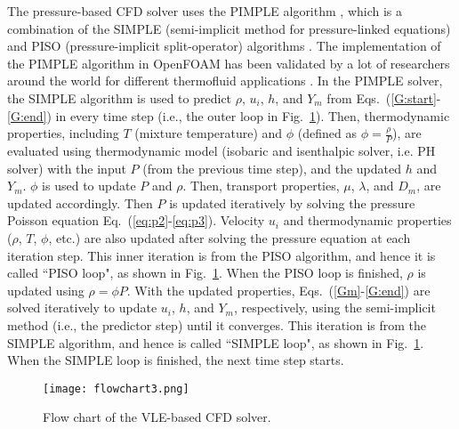 The pressure-based CFD solver uses the PIMPLE algorithm \cite{holzmann2016mathematics}, which is a combination of the SIMPLE (semi-implicit method for pressure-linked equations) \cite{patankar1983calculation} and PISO (pressure-implicit split-operator) algorithms \cite{issa1986solution}. The implementation of the PIMPLE algorithm in OpenFOAM has been validated by a lot of researchers around the world for different thermofluid applications \cite{robertson2015validation, higuera2014three,gaikwad2019openfoam,gamet2020validation,de2017implementation,ashton2019verification}. %
In the PIMPLE solver, the SIMPLE algorithm is used to predict $\rho$, $u_i$, $h$, and $Y_m$ from Eqs.~(\ref{G:start}-\ref{G:end}) in every time step (i.e., the outer loop in Fig.~\ref{FC_CFD}). Then, thermodynamic properties, including $T$ (mixture temperature) and $\phi$ (defined as $\phi = \frac{\rho} {P}$), are evaluated using thermodynamic model (isobaric and isenthalpic solver, i.e. PH solver) with the input $P$ (from the previous time step), and the updated $h$ and $Y_m$. %
$\phi$ is used to update $P$ and $\rho$. Then, transport properties, $\mu$, $\lambda$, and $D_m$, are updated accordingly. Then $P$ is updated iteratively by solving the pressure Poisson equation Eq.~(\ref{eq:p2}-\ref{eq:p3}). Velocity $u_i$ and thermodynamic properties ($\rho$, $T$, $\phi$, etc.) are also updated after solving the pressure equation at each iteration step. This inner iteration is from the PISO algorithm, and hence it is called ``PISO loop", as shown in Fig.~\ref{FC_CFD}. When the PISO loop is finished, $\rho$ is updated using $ \rho = \phi P$. With the updated properties, Eqs.~(\ref{Gm}-\ref{G:end}) are solved iteratively to update $u_i$, $h$, and $Y_m$, respectively, using the semi-implicit method (i.e., the predictor step) until it converges. This iteration is from the SIMPLE algorithm, and hence is called ``SIMPLE loop", as shown in Fig.~\ref{FC_CFD}. When the SIMPLE loop is finished, the next time step starts.


\begin{figure}[htbp]
    \centering
    \texttt{[image: flowchart3.png]}
    \centering
    \caption{Flow chart of the VLE-based CFD solver.}
    \label{FC_CFD}
\end{figure}

